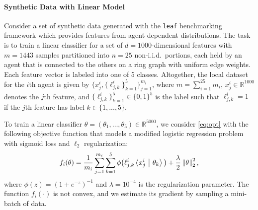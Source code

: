 \documentclass[10pt]{article} %
\theoremstyle{plain}
\theoremstyle{definition}
\theoremstyle{remark}
\newcommand{\dotp}[2]{\left\langle{#1}\ \middle|\ {#2}\right\rangle}
\newcommand{\norm}[1]{\left\| #1 \right\|}
\begin{document}
\paragraph{Synthetic Data with Linear Model}
Consider a set of synthetic data generated with the {\tt leaf} benchmarking framework \citep{caldas2019leaf} which provides features from agent-dependent distributions. The task is to train a linear classifier for a set of $d=1000$-dimensional features with $m=1443$ samples partitioned into $n=25$ non-i.i.d.~portions, each held by an agent that is connected to the others on a ring graph with uniform edge weights. Each feature vector is labeled into one of 5 classes. Altogether, the local dataset for the $i$th agent is given by $\{ x_j^i , \{ \ell_{j,k}^i \}_{k=1}^5 \}_{j=1}^{m_i}$, where $m = \sum_{i=1}^{25} m_i$, $x_j^i \in \mathbb{R}^{1000}$ denotes the $j$th feature, and $\{ \ell_{j,k}^i \}_{k=1}^5 \in \{0,1\}^5$ is the label such that $\ell_{j,k}^i = 1$ if the $j$th feature has label $k \in \{1,...,5\}$. 

\vspace{-.0cm}
To train a linear classifier $\theta = ( \theta_1, \ldots, \theta_5 ) \in \mathbb{R}^{5000}$, we consider \eqref{eq:opt} with the following objective function that models a modified logistic regression problem with sigmoid loss and $\ell_2$ regularization:\vspace{-.0cm}
\begin{equation} \label{eq:syn_obj}
    f_i(\theta) = \frac{1}{m_i} \sum_{j=1}^{m_i} \sum_{k=1}^5 \phi \big( \ell_{j,k}^i \dotp{x_j^i}{\theta_k} \big) + \frac{\lambda}{2}\norm{\theta}_2^2,  \vspace{-.0cm}
\end{equation}
where $\phi(z) = (1 + e^{-z})^{-1}$ and $\lambda = 10^{-4}$ is the regularization parameter. The function $f_i(\cdot)$ is not convex, and we estimate its gradient by sampling a mini-batch of data.
\end{document}
